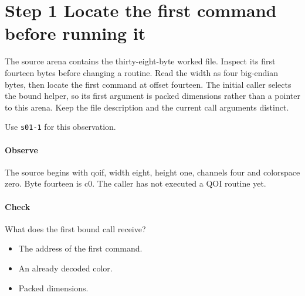 \section{Step 1 Locate the first command before running it}\label{qoi-s01}
The source arena contains the thirty-eight-byte worked file. Inspect its first fourteen bytes before changing a routine. Read the width as four big-endian bytes, then locate the first command at offset fourteen. The initial caller selects the bound helper, so its first argument is packed dimensions rather than a pointer to this arena. Keep the file description and the current call arguments distinct.

Use \texttt{s01-1} for this observation.

\paragraph{Observe} The source begins with qoif, width eight, height one, channels four and colorspace zero. Byte fourteen is c0. The caller has not executed a QOI routine yet.

\paragraph{Check} What does the first bound call receive?
\begin{itemize}
  \item[A.] The address of the first command.
  \item[B.] An already decoded color.
  \item[C.] Packed dimensions.
\end{itemize}
